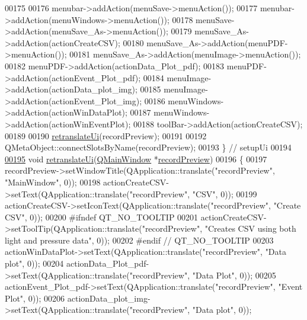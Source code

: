 \begin{DoxyCode}
00175 
00176         menubar->addAction(menuSave->menuAction());
00177         menubar->addAction(menuWindows->menuAction());
00178         menuSave->addAction(menuSave\_As->menuAction());
00179         menuSave\_As->addAction(actionCreateCSV);
00180         menuSave\_As->addAction(menuPDF->menuAction());
00181         menuSave\_As->addAction(menuImage->menuAction());
00182         menuPDF->addAction(actionData\_Plot\_pdf);
00183         menuPDF->addAction(actionEvent\_Plot\_pdf);
00184         menuImage->addAction(actionData\_plot\_img);
00185         menuImage->addAction(actionEvent\_Plot\_img);
00186         menuWindows->addAction(actionWinDataPlot);
00187         menuWindows->addAction(actionWinEventPlot);
00188         toolBar->addAction(actionCreateCSV);
00189 
00190         \hyperlink{a00028_ad30b831cfb4b32956fe67a79748ba194}{retranslateUi}(recordPreview);
00191 
00192         QMetaObject::connectSlotsByName(recordPreview);
00193     \} \textcolor{comment}{// setupUi}
00194 
\hypertarget{a00053_source_l00195}{}\hyperlink{a00028_ad30b831cfb4b32956fe67a79748ba194}{00195}     \textcolor{keywordtype}{void} \hyperlink{a00028_ad30b831cfb4b32956fe67a79748ba194}{retranslateUi}(\hyperlink{a00010}{QMainWindow} *\hyperlink{a00020}{recordPreview})
00196     \{
00197         recordPreview->setWindowTitle(QApplication::translate(\textcolor{stringliteral}{"recordPreview"}, \textcolor{stringliteral}{"MainWindow"}, 0));
00198         actionCreateCSV->setText(QApplication::translate(\textcolor{stringliteral}{"recordPreview"}, \textcolor{stringliteral}{"CSV"}, 0));
00199         actionCreateCSV->setIconText(QApplication::translate(\textcolor{stringliteral}{"recordPreview"}, \textcolor{stringliteral}{"Create CSV"}, 0));
00200 \textcolor{preprocessor}{#ifndef QT\_NO\_TOOLTIP}
00201         actionCreateCSV->setToolTip(QApplication::translate(\textcolor{stringliteral}{"recordPreview"}, \textcolor{stringliteral}{"Creates CSV using both light
       and pressure data"}, 0));
00202 \textcolor{preprocessor}{#endif // QT\_NO\_TOOLTIP}
00203         actionWinDataPlot->setText(QApplication::translate(\textcolor{stringliteral}{"recordPreview"}, \textcolor{stringliteral}{"Data plot"}, 0));
00204         actionData\_Plot\_pdf->setText(QApplication::translate(\textcolor{stringliteral}{"recordPreview"}, \textcolor{stringliteral}{"Data Plot"}, 0));
00205         actionEvent\_Plot\_pdf->setText(QApplication::translate(\textcolor{stringliteral}{"recordPreview"}, \textcolor{stringliteral}{"Event Plot"}, 0));
00206         actionData\_plot\_img->setText(QApplication::translate(\textcolor{stringliteral}{"recordPreview"}, \textcolor{stringliteral}{"Data plot"}, 0));

\end{DoxyCode}
